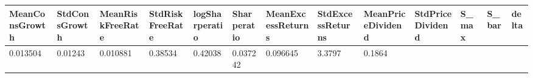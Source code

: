 \begin{tabular}{lllllllllllll}
\toprule 
MeanConsGrowth & StdConsGrowth & MeanRiskFreeRate & StdRiskFreeRate & logSharperatio & Sharperatio & MeanExcessReturns & StdExcessReturns & MeanPriceDividend & StdPriceDividend & S_max & S_bar & delta \\ 
\midrule 
0.013504 & 0.01243 & 0.010881 & 0.38534 & 0.42038 & 0.037242 & 0.096645 & 3.3797 & 0.1864 \\ 
\bottomrule 
\end{tabular}